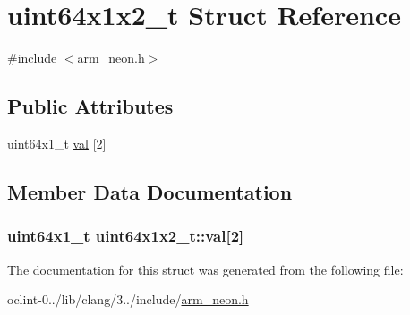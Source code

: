 \hypertarget{structuint64x1x2__t}{\section{uint64x1x2\-\_\-t Struct Reference}
\label{structuint64x1x2__t}
}


{\ttfamily \#include $<$arm\-\_\-neon.\-h$>$}

\subsection*{Public Attributes}
\begin{DoxyCompactItemize}
\item 
uint64x1\-\_\-t \hyperlink{structuint64x1x2__t_a8d401e43d7245dfe87578685aa97c8d1}{val} \mbox{[}2\mbox{]}
\end{DoxyCompactItemize}


\subsection{Member Data Documentation}
\hypertarget{structuint64x1x2__t_a8d401e43d7245dfe87578685aa97c8d1}{
\subsubsection[{val}]{\setlength{\rightskip}{0pt plus 5cm}uint64x1\-\_\-t uint64x1x2\-\_\-t\-::val\mbox{[}2\mbox{]}}}\label{structuint64x1x2__t_a8d401e43d7245dfe87578685aa97c8d1}


The documentation for this struct was generated from the following file\-:\begin{DoxyCompactItemize}
\item 
oclint-\/0../lib/clang/3../include/\hyperlink{arm__neon_8h}{arm\-\_\-neon.\-h}\end{DoxyCompactItemize}
